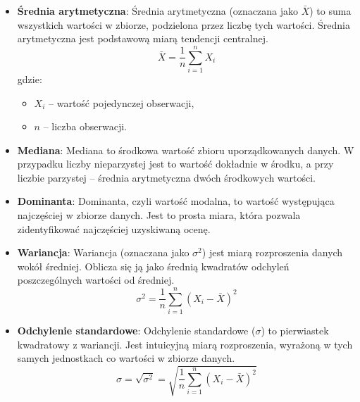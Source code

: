 \begin{itemize}
	\item \textbf{Średnia arytmetyczna}: Średnia arytmetyczna (oznaczana jako \( \bar{X} \)) to suma wszystkich wartości w zbiorze, podzielona przez liczbę tych wartości. Średnia arytmetyczna jest podstawową miarą tendencji centralnej.
	\[
	\bar{X} = \frac{1}{n} \sum_{i=1}^{n} X_i
	\]
	gdzie:
	\begin{itemize}
		\item \( X_i \) – wartość pojedynczej obserwacji,
		\item \( n \) – liczba obserwacji.
	\end{itemize}
	
	\item \textbf{Mediana}: Mediana to środkowa wartość zbioru uporządkowanych danych. W przypadku liczby nieparzystej jest to wartość dokładnie w środku, a przy liczbie parzystej – średnia arytmetyczna dwóch środkowych wartości.
	
	\item \textbf{Dominanta}: Dominanta, czyli wartość modalna, to wartość występująca najczęściej w zbiorze danych. Jest to prosta miara, która pozwala zidentyfikować najczęściej uzyskiwaną ocenę.
	
	\item \textbf{Wariancja}: Wariancja (oznaczana jako \( \sigma^2 \)) jest miarą rozproszenia danych wokół średniej. Oblicza się ją jako średnią kwadratów odchyleń poszczególnych wartości od średniej.
	\[
	\sigma^2 = \frac{1}{n} \sum_{i=1}^{n} (X_i - \bar{X})^2
	\]
	
	\item \textbf{Odchylenie standardowe}: Odchylenie standardowe (\( \sigma \)) to pierwiastek kwadratowy z wariancji. Jest intuicyjną miarą rozproszenia, wyrażoną w tych samych jednostkach co wartości w zbiorze danych.
	\[
	\sigma = \sqrt{\sigma^2} = \sqrt{\frac{1}{n} \sum_{i=1}^{n} (X_i - \bar{X})^2}
	\]
\end{itemize}

